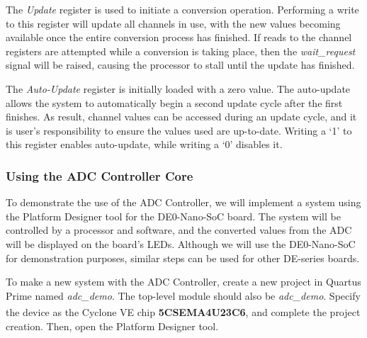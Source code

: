 \documentclass[11pt, twoside, pdftex]{article}
\begin{document}
The \textit{Update} register is used to initiate a conversion operation. Performing a write to this register will update all channels in use, with the new values becoming available once the entire conversion process has finished. If reads to the channel registers are attempted while a conversion is taking place, then the {\it wait\_request} signal will be raised, causing the processor to stall until the update has finished.

The \textit{Auto-Update} register is initially loaded with a zero value. The auto-update allows the system to automatically begin a second update cycle after the first finishes. As result, channel values can be accessed during an update cycle, and it is user's responsibility to ensure the values used are up-to-date. Writing a `1' to this register enables auto-update, while writing a `0' disables it.

\subsubsection{Using the ADC Controller Core}
To demonstrate the use of the ADC Controller, we will implement a system using the Platform Designer tool for the DE0-Nano-SoC board. The system will be controlled by a processor and software, and the converted values from the ADC will be displayed on the board's LEDs. Although we will use the DE0-Nano-SoC for demonstration purposes, similar steps can be used for other DE-series boards.

To make a new system with the ADC Controller, create a new project in Quartus Prime named {\it adc\_demo}. The top-level module should also be {\it adc\_demo}. Specify the device as the Cyclone\textsuperscript{\textregistered} VE chip {\bf 5CSEMA4U23C6}, and complete the project creation. Then, open the Platform Designer tool.
\end{document}
